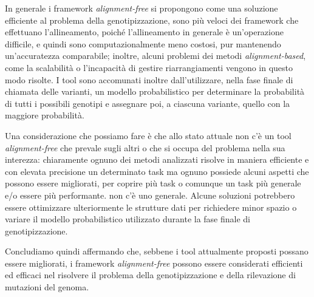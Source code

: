 \documentclass[../main.tex]{subfiles}
\begin{document}
In generale i framework \textit{alignment-free} si propongono come una soluzione efficiente al problema della genotipizzazione, sono più veloci dei framework che effettuano l'allineamento, poiché l'allineamento in generale è un'operazione difficile, e quindi sono computazionalmente meno costosi, pur mantenendo un'accuratezza comparabile; inoltre, alcuni problemi dei metodi \textit{alignment-based}, come la scalabilità o l'incapacità di gestire riarrangiamenti vengono in questo modo risolte. I tool sono accomunati inoltre dall'utilizzare, nella fase finale di chiamata delle varianti, un modello probabilistico per determinare la probabilità di tutti i possibili genotipi e assegnare poi, a ciascuna variante, quello con la maggiore probabilità.

Una considerazione che possiamo fare è che allo stato attuale non c'è un tool \textit{alignment-free} che prevale sugli altri o che si occupa del problema nella sua interezza: chiaramente ognuno dei metodi analizzati risolve in maniera efficiente e con elevata precisione un determinato task ma ognuno possiede alcuni aspetti che possono essere migliorati, per coprire più task o comunque un task più generale e/o essere più performante.
non c'è uno generale. Alcune soluzioni potrebbero essere ottimizzare ulteriormente le strutture dati per richiedere minor spazio o variare il modello probabilistico utilizzato durante la fase finale di genotipizzazione.

Concludiamo quindi affermando che, sebbene i tool attualmente proposti possano essere migliorati, i framework \textit{alignment-free} possono essere considerati efficienti ed efficaci nel risolvere il problema della genotipizzazione e della rilevazione di mutazioni del genoma. 
\end{document}
